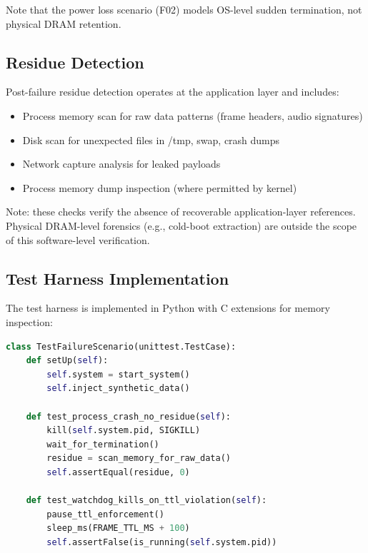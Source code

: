 \documentclass[conference]{IEEEtran}
\begin{document}
Note that the power loss scenario (F02) models OS-level sudden termination, not physical DRAM retention.

\subsection{Residue Detection}
Post-failure residue detection operates at the application layer and includes:
\begin{itemize}
    \item Process memory scan for raw data patterns (frame headers, audio signatures)
    \item Disk scan for unexpected files in /tmp, swap, crash dumps
    \item Network capture analysis for leaked payloads
    \item Process memory dump inspection (where permitted by kernel)
\end{itemize}
Note: these checks verify the absence of recoverable application-layer references. Physical DRAM-level forensics (e.g., cold-boot extraction) are outside the scope of this software-level verification.

\subsection{Test Harness Implementation}
The test harness is implemented in Python with C extensions for memory inspection:

\begin{lstlisting}[language=Python, caption={Fault Injection Test Structure}]
class TestFailureScenario(unittest.TestCase):
    def setUp(self):
        self.system = start_system()
        self.inject_synthetic_data()
        
    def test_process_crash_no_residue(self):
        kill(self.system.pid, SIGKILL)
        wait_for_termination()
        residue = scan_memory_for_raw_data()
        self.assertEqual(residue, 0)
        
    def test_watchdog_kills_on_ttl_violation(self):
        pause_ttl_enforcement()
        sleep_ms(FRAME_TTL_MS + 100)
        self.assertFalse(is_running(self.system.pid))
\end{lstlisting}
\end{document}
